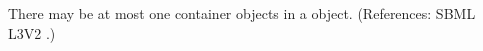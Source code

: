 There may be at most one \ListOfUnits container objects in a
\UnitDefinition object.  (References: SBML L3V2
.)
